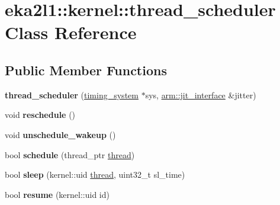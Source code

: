 \hypertarget{classeka2l1_1_1kernel_1_1thread__scheduler}{}\section{eka2l1\+:\+:kernel\+:\+:thread\+\_\+scheduler Class Reference}
\label{classeka2l1_1_1kernel_1_1thread__scheduler}
\subsection*{Public Member Functions}
\begin{DoxyCompactItemize}
\item 
\mbox{\label{classeka2l1_1_1kernel_1_1thread__scheduler_a6b3167678e8a32f7c40f8627b3f408c2}} 
{\bfseries thread\+\_\+scheduler} (\mbox{\hyperlink{classeka2l1_1_1timing__system}{timing\+\_\+system}} $\ast$sys, \mbox{\hyperlink{classeka2l1_1_1arm_1_1jit__interface}{arm\+::jit\+\_\+interface}} \&jitter)
\item 
\mbox{\label{classeka2l1_1_1kernel_1_1thread__scheduler_aac85213d583c6c686ffac2d8f46d3d9c}} 
void {\bfseries reschedule} ()
\item 
\mbox{\label{classeka2l1_1_1kernel_1_1thread__scheduler_a62b6de212cffef0a9bba649cb318c66a}} 
void {\bfseries unschedule\+\_\+wakeup} ()
\item 
\mbox{\label{classeka2l1_1_1kernel_1_1thread__scheduler_ab791504be56864dc1a93627002e69152}} 
bool {\bfseries schedule} (thread\+\_\+ptr \mbox{\hyperlink{classeka2l1_1_1kernel_1_1thread}{thread}})
\item 
\mbox{\label{classeka2l1_1_1kernel_1_1thread__scheduler_abd44f855336a5e904282f425a8bedaf5}} 
bool {\bfseries sleep} (kernel\+::uid \mbox{\hyperlink{classeka2l1_1_1kernel_1_1thread}{thread}}, uint32\+\_\+t sl\+\_\+time)
\item 
\mbox{\label{classeka2l1_1_1kernel_1_1thread__scheduler_ad02ba4bd512aa44dba126ad7c98719cb}} 
bool {\bfseries resume} (kernel\+::uid id)

\end{DoxyCompactItemize}
